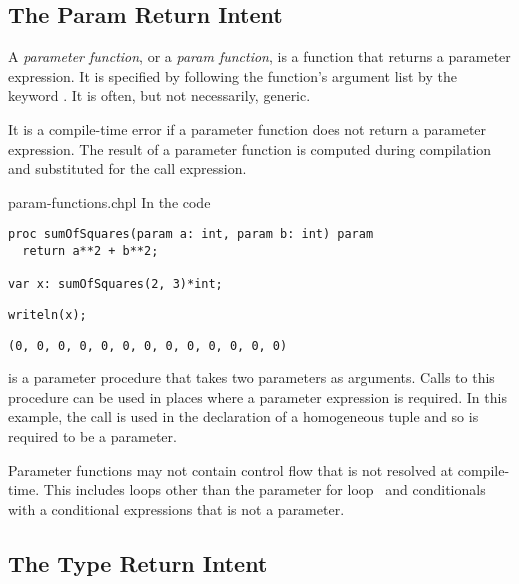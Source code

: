 \subsection{The Param Return Intent}
\label{Param_Return_Intent}

A \emph{parameter function}, or a \emph{param function}, is a function that
returns a parameter expression.  It is specified by following the function's
argument list by the keyword .  It is often, but not necessarily,
generic.

It is a compile-time error if a parameter function does not return a
parameter expression.  The result of a parameter function is computed
during compilation and substituted for the call expression.

\begin{chapelexample}{param-functions.chpl}
In the code
\begin{chapel}
\begin{verbatim}
proc sumOfSquares(param a: int, param b: int) param
  return a**2 + b**2;

var x: sumOfSquares(2, 3)*int;
\end{verbatim}
\end{chapel}
\begin{chapelpost}
\begin{verbatim}
writeln(x);
\end{verbatim}
\end{chapelpost}
\begin{chapeloutput}
\begin{verbatim}
(0, 0, 0, 0, 0, 0, 0, 0, 0, 0, 0, 0, 0)
\end{verbatim}
\end{chapeloutput}
 is a parameter procedure that takes
two parameters as arguments.  Calls to this procedure can be used in
places where a parameter expression is required.  In this example, the
call is used in the declaration of a homogeneous tuple and so is
required to be a parameter.
\end{chapelexample}

Parameter functions may not contain control flow that is not resolved
at compile-time.  This includes loops other than the parameter for
loop~ and conditionals with a conditional
expressions that is not a parameter.


\subsection{The Type Return Intent}
\label{Type_Return_Intent}

